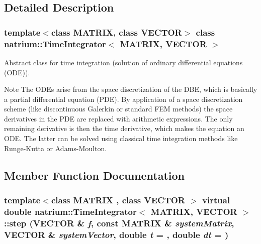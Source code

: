 \subsection{Detailed Description}
\subsubsection*{template$<$class MATRIX, class VECTOR$>$ class natrium::TimeIntegrator$<$ MATRIX, VECTOR $>$}

Abstract class for time integration (solution of ordinary differential equations (ODE)). \begin{DoxyNote}{Note}
The ODEs arise from the space discretization of the DBE, which is basically a partial differential equation (PDE). By application of a space discretization scheme (like discontinuous Galerkin or standard FEM methods) the space derivatives in the PDE are replaced with arithmetic expressions. The only remaining derivative is then the time derivative, which makes the equation an ODE. The latter can be solved using classical time integration methods like Runge-\/Kutta or Adams-\/Moulton. 
\end{DoxyNote}


\subsection{Member Function Documentation}
\hypertarget{classnatrium_1_1TimeIntegrator_a0237ebbaf737c7d3278777fb08007e99}{
\subsubsection[{step}]{\setlength{\rightskip}{0pt plus 5cm}template$<$class MATRIX , class VECTOR $>$ virtual double {\bf natrium::TimeIntegrator}$<$ MATRIX, VECTOR $>$::step (VECTOR \& {\em f}, \/  const MATRIX \& {\em systemMatrix}, \/  VECTOR \& {\em systemVector}, \/  double {\em t} = {}, \/  double {\em dt} = {})}}
\label{classnatrium_1_1TimeIntegrator_a0237ebbaf737c7d3278777fb08007e99}



